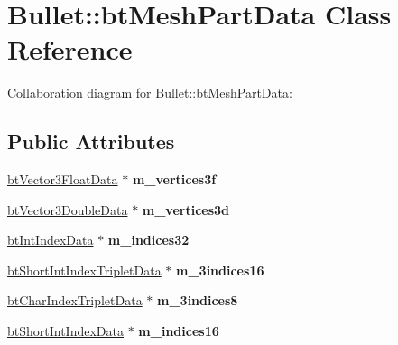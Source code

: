 \hypertarget{class_bullet_1_1bt_mesh_part_data}{\section{Bullet\+:\+:bt\+Mesh\+Part\+Data Class Reference}
\label{class_bullet_1_1bt_mesh_part_data}
}


Collaboration diagram for Bullet\+:\+:bt\+Mesh\+Part\+Data\+:
\subsection*{Public Attributes}
\begin{DoxyCompactItemize}
\item 
\hypertarget{class_bullet_1_1bt_mesh_part_data_af12b570da6a8dde0d50ef48845b3d28c}{\hyperlink{class_bullet_1_1bt_vector3_float_data}{bt\+Vector3\+Float\+Data} $\ast$ {\bfseries m\+\_\+vertices3f}}\label{class_bullet_1_1bt_mesh_part_data_af12b570da6a8dde0d50ef48845b3d28c}

\item 
\hypertarget{class_bullet_1_1bt_mesh_part_data_afdde044bb44cb063f72de38a6d6637fd}{\hyperlink{class_bullet_1_1bt_vector3_double_data}{bt\+Vector3\+Double\+Data} $\ast$ {\bfseries m\+\_\+vertices3d}}\label{class_bullet_1_1bt_mesh_part_data_afdde044bb44cb063f72de38a6d6637fd}

\item 
\hypertarget{class_bullet_1_1bt_mesh_part_data_a5a55d64c683ca6bf69f8d93054914170}{\hyperlink{class_bullet_1_1bt_int_index_data}{bt\+Int\+Index\+Data} $\ast$ {\bfseries m\+\_\+indices32}}\label{class_bullet_1_1bt_mesh_part_data_a5a55d64c683ca6bf69f8d93054914170}

\item 
\hypertarget{class_bullet_1_1bt_mesh_part_data_a7a0786f4bdbc5eb0189a46a53a821054}{\hyperlink{class_bullet_1_1bt_short_int_index_triplet_data}{bt\+Short\+Int\+Index\+Triplet\+Data} $\ast$ {\bfseries m\+\_\+3indices16}}\label{class_bullet_1_1bt_mesh_part_data_a7a0786f4bdbc5eb0189a46a53a821054}

\item 
\hypertarget{class_bullet_1_1bt_mesh_part_data_a27c78b90dea7e54814d89cf51f668ac5}{\hyperlink{class_bullet_1_1bt_char_index_triplet_data}{bt\+Char\+Index\+Triplet\+Data} $\ast$ {\bfseries m\+\_\+3indices8}}\label{class_bullet_1_1bt_mesh_part_data_a27c78b90dea7e54814d89cf51f668ac5}

\item 
\hypertarget{class_bullet_1_1bt_mesh_part_data_af185788fd1021577974d84e691f8a722}{\hyperlink{class_bullet_1_1bt_short_int_index_data}{bt\+Short\+Int\+Index\+Data} $\ast$ {\bfseries m\+\_\+indices16}}\label{class_bullet_1_1bt_mesh_part_data_af185788fd1021577974d84e691f8a722}


\end{DoxyCompactItemize}
